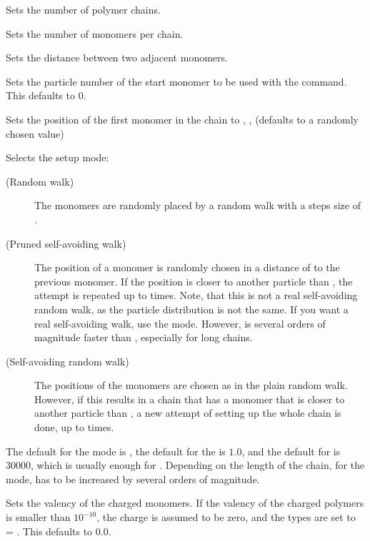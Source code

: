 \begin{arguments}
\item[\var{num\_polymers}] Sets the number of polymer chains.
\item[\var{monomers\_per\_chain}] Sets the number of monomers per
  chain.
\item[\var{bond\_length}] Sets the distance between two adjacent
  monomers.
\item[\opt{start \var{part\_id}}] Sets the particle number of the
  start monomer to be used with the  command. This
  defaults to 0.

\item[\opt{pos \var{x} \var{y} \var{z}}] Sets the position of the
  first monomer in the chain to , ,  (defaults to
  a randomly chosen value)
  
\item[\opt{mode < RW | PSAW | SAW > [\var{shield} [\var{max\_try}]]}]
  Selects the setup mode:
  \begin{description}
  \item[ (Random walk)] The monomers are
    randomly placed by a random walk with a steps size of
    .
  \item[ (Pruned self-avoiding walk)] The position of a
    monomer is randomly chosen in a distance of  to
    the previous monomer. If the position is closer to another
    particle than , the attempt is repeated up to
     times. Note, that this is not a real self-avoiding
    random walk, as the particle distribution is not the same. If you
    want a real self-avoiding walk, use the  mode.
    However,  is several orders of magnitude faster than
    , especially for long chains.
  \item[ (Self-avoiding random walk)] The positions of
    the monomers are chosen as in the plain random walk. However, if
    this results in a chain that has a monomer that is closer to
    another particle than , a new attempt of setting up
    the whole chain is done, up to  times.
  \end{description}
  The default for the mode is , the default for the
   is $1.0$, and the default for  is
  $30000$, which is usually enough for . Depending on
  the length of the chain, for the  mode, 
  has to be increased by several orders of magnitude.
\item[\opt{charge \var{val\_charged\_monomer}}] Sets the valency of
  the charged monomers.  If the valency of the charged polymers
   is smaller than $10^{-10}$, the charge
  is assumed to be zero, and the types are set to
   = . This
  defaults to 0.0.


\end{arguments}
